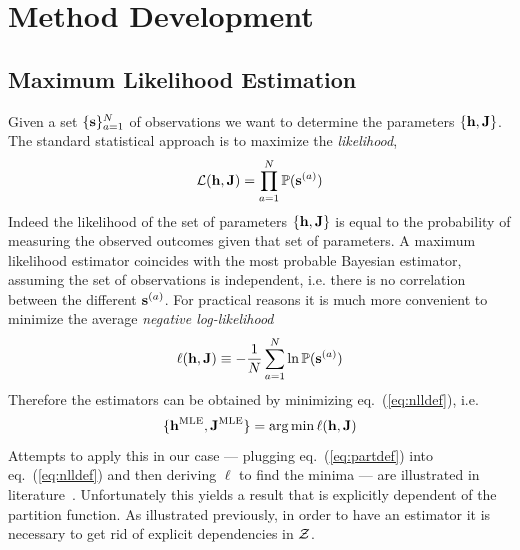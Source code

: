 \documentclass[a4paper,12pt,twoside]{article}
\def \eq#1{eq.~(\ref{#1})}
\def \be {\begin{equation}}
\def \ee {\end{equation}}
\def \bf {\textbf}
\def \part {{\cal Z}}
\def \P {{\mathbb{P}}}
\begin{document}
\section{Method Development}
\subsection{Maximum Likelihood Estimation}
Given a set $\{\bf s\}_{a=1}^N$ of  observations we want to determine the parameters $\{\bf  h,\bf J\}$.
The standard statistical approach is to maximize the {\em likelihood},
\be
  {\cal L}(\bf h,\bf J) = \prod_{a=1}^N \P(\bf s^{(a)})
  \label{eq:likedef}
\ee
Indeed the likelihood of the set of parameters  $\{\bf  h,\bf J\}$ is equal to the probability of measuring the observed outcomes given that set of parameters.
A maximum likelihood estimator coincides with the most probable Bayesian estimator, assuming the set of observations is independent, i.e. there is no correlation between the different $\bf s^{(a)}$.
For practical reasons it is much more convenient to minimize the average {\em negative log-likelihood}~\cite{eke2012}
\be
  \ell(\bf h,\bf J) \equiv -\frac{1}{N}\sum_{a=1}^N \ln \P(\bf s^{(a)})
  \label{eq:nlldef}
\ee
Therefore the estimators can be obtained by minimizing \eq{eq:nlldef}, i.e.
\be
  \{\bf h^{\rm MLE}, \bf J^{\rm MLE}\} = \arg\min \ell(\bf h,\bf J)
\ee
Attempts to apply this in our case --- plugging \eq{eq:partdef} into \eq{eq:nlldef} and then deriving $\ell$ to find the minima --- are illustrated in literature~\cite{eke2012}.
Unfortunately this yields a result that  is explicitly dependent of the partition function.
As illustrated previously, in order to have an estimator it is necessary to get rid of explicit dependencies in $\part$.
\end{document}
